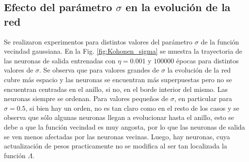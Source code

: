 \documentclass[11pt,twocolumn,twoside]{opticajnl}
\begin{document}
\subsection{Efecto del parámetro $\sigma$ en la evolución de la red \label{sec:sigma}}

Se realizaron experimentos para distintos valores del parámetro $\sigma$ de la función vecindad gaussiana. En la Fig. \ref{fig:Kohonen_sigma} se muestra la trayectoria de las neuronas de salida entrenadas con $\eta=0.001$ y $100000$ épocas para distintos valores de $\sigma$. Se observa que para valores grandes de $\sigma$ la evolución de la red cubre más espacio y las neuronas se encuentran más superpuestas pero no se encuentran centradas en el anillo, si no, en el borde interior del mismo. Las neuronas siempre se ordenan. Para valores pequeños de $\sigma$, en particular para $\sigma=0.5$, si bien hay un orden, no es tan claro como en el resto de los casos y se observa que sólo algunas neuronas llegan a evolucionar hasta el anillo, esto se debe a que la función vecindad es muy angosta, por lo que las neuronas de salida se ven menos afectadas por las neuronas vecinas. Luego, hay neuronas, cuya actualización de pesos practicamente no se modifica al ser tan localizada la función $\Lambda$.
\end{document}
